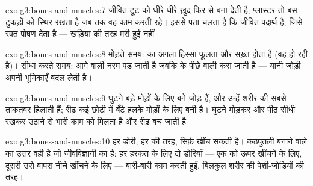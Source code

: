 \begin{solution}{exo:g3:bones-and-muscles:7}
जीवित  टूट को धीरे-धीरे ख़ुद फिर से बना देती है; प्लास्टर तो बस
टुकड़ों को स्थिर रखता है जब तक वह काम करती रहे। इससे पता चलता है कि
 जीवित पदार्थ है, जिसे रक्त पोषण देता है --- खड़िया की तरह मरी
हुई नहीं।
\end{solution}

\begin{solution}{exo:g3:bones-and-muscles:8}
मोड़ते समय:  का अगला हिस्सा फूलता और सख़्त होता है (वह 
 हो रही है)। सीधा करते समय: आगे वाली नरम पड़ जाती है जबकि 
के पीछे वाली कस जाती है --- यानी जोड़ी अपनी भूमिकाएँ बदल लेती है।
\end{solution}

\begin{solution}{exo:g3:bones-and-muscles:9}
घुटने बड़े मोड़ों के लिए बने जोड़ हैं, और उन्हें शरीर की सबसे ताक़तवर
 हिलाती हैं; रीढ़ कई छोटी  में बँटे हलके मोड़ों के लिए
बनी है। घुटने मोड़कर और पीठ सीधी रखकर उठाने से भारी काम  को
मिलता है और रीढ़ बच जाती है।
\end{solution}

\begin{solution}{exo:g3:bones-and-muscles:10}
हर डोरी, हर  की तरह, सिर्फ़ खींच सकती है। कठपुतली बनाने वाले का
उत्तर वही है जो जीवविज्ञानी का है: हर हरकत के लिए दो डोरियाँ --- एक
 को ऊपर खींचने के लिए, दूसरी उसे वापस नीचे खींचने के लिए ---
बारी-बारी काम करती हुईं, बिलकुल शरीर की पेशी-जोड़ियों की तरह।
\end{solution}
